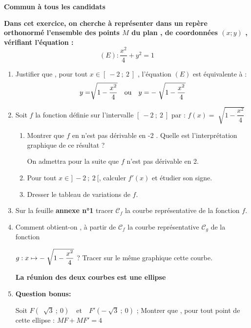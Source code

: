 \documentclass[12pt,a4paper,french]{article}
\newcommand{\brm}[1]{\marginpar{\addpoints*{#1}}}%
\begin{document}
\vfill
\newpage
{}
\begin{question}
\vspace{-5.8mm}
\begin{center}\textbf{Commun à tous les candidats}\end{center}
\textbf{Dans cet exercice,  on cherche à représenter dans un repère orthonormé l’ensemble des points  $M$ du plan , de coordonnées $( x;y)$ , vérifiant l’équation :}
\[(E):\dfrac{x^2}{4}+y^2=1 \]
\begin{enumerate}[itemsep=8pt]
\item Justifier que , pour tout $x\in[~-2~;~2~]$ , l’équation $(E)$ est équivalente  à : \[ y=\sqrt[]{1-\dfrac{x^2}{4}}\quad  \mbox{ou}\quad y =-\hspace{2mm}\sqrt[]{1-\dfrac{x^2}{4}}\]  \brm{0.5}
\item Soit $f$  la fonction définie sur l’intervalle $[~-2~;~2~]$ par : 
$f(x)=\sqrt[]{1-\dfrac{x^2}{4}}$ 
\begin{enumerate}[itemsep=5pt]
\item Montrer que  $ f$ en n'est pas dérivable en  -2 .  Quelle est l’interprétation  graphique de ce résultat ? \brm{1}

On admettra pour la suite que $f$ n'est pas dérivable en 2.
\item Pour tout $x\in]~-2~;~2~[$, calculer $f'(x)$ et étudier son signe. \brm{1}

\item Dresser le tableau de variations de $f$. \brm{0.5}
\end{enumerate}
\item Sur la feuille \textbf{annexe n°1} tracer $\mathscr{C}_{f}$ la courbe représentative de la fonction $f$. \brm{1}
\item Comment obtient-on , à partir de $\mathscr{C}_{f} $ la courbe représentative $ \mathscr{C}_{g}$  de la fonction \brm{1}

$g:x \mapsto -\hspace{2mm} \sqrt[]{1-\dfrac{x^2}{4}}$ ? Tracer sur le même graphique cette courbe.

\textbf{La réunion des deux courbes est une ellipse}
\item \textbf{Question bonus:}

Soit $F(~\sqrt[]{3}~  ;~0 )\quad \mbox{et}\quad F' (-~\sqrt{3}~;~0)$ ; Montrer que , pour tout point de cette ellipse :
$MF+MF'=4$

\end{enumerate}

\end{question}
\end{document}
